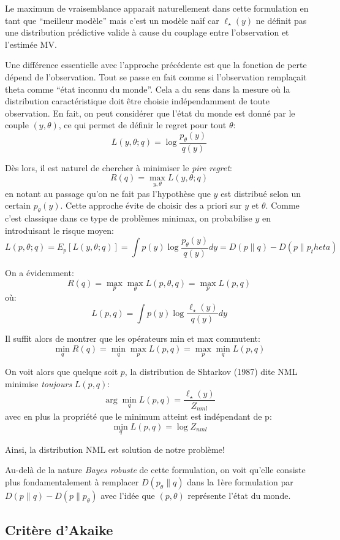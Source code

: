 \documentclass{article}
\begin{document}
Le maximum de vraisemblance apparait naturellement dans cette formulation en tant que ``meilleur mod\`ele'' mais c'est un mod\`ele na\"if car $\ell_\star(y)$ ne d\'efinit pas une distribution pr\'edictive valide \`a cause du couplage entre l'observation et l'estim\'ee MV. 

Une diff\'erence essentielle avec l'approche pr\'ec\'edente est que la fonction de perte d\'epend de l'observation. Tout se passe en fait comme si l'observation rempla\c{c}ait theta comme ``\'etat inconnu du monde''. Cela a du sens dans la mesure o\`u la distribution caract\'eristique doit \^etre choisie ind\'ependamment de toute observation. En fait, on peut consid\'erer que l'\'etat du monde est donn\'e par le couple $(y, \theta)$, ce qui permet de d\'efinir le regret pour tout $\theta$: 
$$
L(y, \theta; q) = \log \frac{p_\theta(y)}{q(y)}
$$ 

D\`es lors, il est naturel de chercher \`a minimiser le {\em pire regret}: 
$$
R(q) = \max_{y, \theta} L(y, \theta; q)
$$ 
en notant au passage qu'on ne fait pas l'hypoth\`ese que $y$ est distribu\'e selon un certain $p_\theta(y)$. Cette approche \'evite de choisir des a priori sur $y$ et $\theta$. Comme c'est classique dans ce type de probl\`emes minimax, on probabilise $y$ en introduisant le risque moyen:
$$
L(p, \theta; q) 
= E_p [L(y, \theta; q)] 
= \int p(y) \log \frac{p_\theta(y)}{q(y)} dy 
= D(p\|q) - D(p\|p_theta) 
$$ 

On a \'evidemment: 
$$R(q) = \max_p \max_\theta L(p, \theta, q) = \max_p L(p, q)$$ 
o\`u: 
$$L(p, q) = \int p(y) \log \frac{\ell_\star(y)}{q(y)} dy$$ 

Il suffit alors de montrer que les op\'erateurs min et max commutent:  
$$\min_q R(q) = \min_q \max_p L(p, q) = \max_p \min_q L(p, q)$$ 

On voit alors que quelque soit $p$, la distribution de Shtarkov (1987) dite NML minimise {\em toujours} $L(p, q)$: 
$$\arg\min_q L(p, q) = \frac{\ell_\star(y)}{Z_{nml}}$$ 
avec en plus la propri\'et\'e que le minimum atteint est ind\'ependant de p: 
$$\min_q L(p, q) = \log Z_{nml}$$

Ainsi, la distribution NML est solution de notre probl\`eme! 

Au-del\`a de la nature {\em Bayes robuste} de cette formulation, on voit qu'elle consiste plus fondamentalement \`a remplacer $D(p_\theta\|q)$ dans la 1\`ere formulation par $D(p\|q) - D(p\|p_\theta)$ avec l'id\'ee que $(p,\theta)$ repr\'esente l'\'etat du monde. 


\subsection{Crit\`ere d'Akaike}
\end{document}

